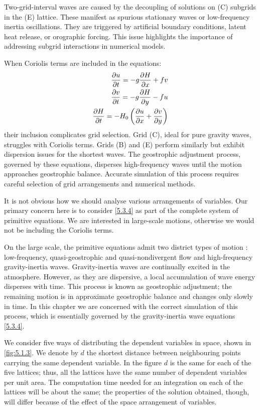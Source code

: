 Two-grid-interval waves are caused by the decoupling of solutions on (C) subgrids in the (E) lattice. These manifest as spurious stationary waves or low-frequency inertia oscillations. They are triggered by artificial boundary conditions, latent heat release, or orographic forcing. This issue highlights the importance of addressing subgrid interactions in numerical models.

When Coriolis terms are included in the equations:
\begin{align}\label{5.3.4}
    \frac{\partial u}{\partial t}=-g\frac{\partial H}{\partial x}+fv \\
    \frac{\partial v}{\partial t}=-g\frac{\partial H}{\partial y}-fu \notag \\
    \frac{\partial H}{\partial t}=-H_0\left(\frac{\partial u}{\partial x}+\frac{\partial v}{\partial y}\right)\notag
\end{align}
their inclusion complicates grid selection. Grid (C), ideal for pure gravity waves, struggles with Coriolis terms. Grids (B) and (E) perform similarly but exhibit dispersion issues for the shortest waves. The geostrophic adjustment process, governed by these equations, disperses high-frequency waves until the motion approaches geostrophic balance. Accurate simulation of this process requires careful selection of grid arrangements and numerical methods.

It is not obvious how we should analyse various arrangements of variables. Our primary concern here is to consider \ref{5.3.4} as part of the complete system of primitive equations. We are interested in large-scale motions, otherwise we would not be including the Coriolis terms.

On the large scale, the primitive equations admit two district types of motion : low-frequency, quasi-geostrophic and quasi-nondivergent flow and high-frequency gravity-inertia waves. Gravity-inertia waves are continually excited in the atmosphere. However, as they are dispersive, a local accumulation of wave energy disperses with time. This process is known as geostrophic adjustment; the remaining motion is in approximate geostrophic balance and changes only slowly in time. In this chapter we are concerned with the correct simulation of this process, which is essentially governed by the gravity-inertia wave equations \ref{5.3.4}.
 
We consider five ways of distributing the dependent variables in space, shown in \ref{fig:5.1.3}. We denote by $d$ the shortest distance between neighbouring points carrying the same dependent variable. In the figure $d$ is the same for each of the five lattices; thus, all the lattices have the same number of dependent variables per unit area. The computation time needed for an integration on each of the lattices will be about the same; the properties of the solution obtained, though, will differ because of the effect of the space arrangement of variables.

